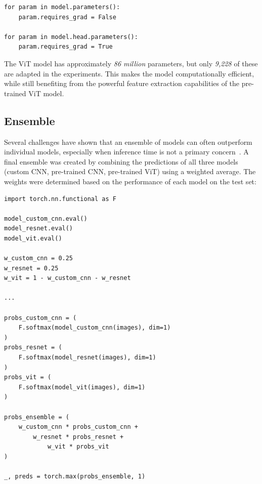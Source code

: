 \begin{minipage}{0.9\linewidth}\begin{lstlisting}[caption={Freezing the pre-trained ViT backbone and training only the classification head.},label={lst:freeze-vit-backbone}]
for param in model.parameters():
    param.requires_grad = False

for param in model.head.parameters():
    param.requires_grad = True
\end{lstlisting}\end{minipage}

The ViT model has approximately \textit{86 million} parameters, but only \textit{9,228} of these are adapted in the experiments. This makes the model computationally efficient, while still benefiting from the powerful feature extraction capabilities of the pre-trained ViT model.

\subsection{Ensemble}

Several challenges have shown that an ensemble of models can often outperform individual models, especially when inference time is not a primary concern~\cite{Stallkamp2012,DBLP:journals/corr/HeZRS15}. A final ensemble was created by combining the predictions of all three models (custom CNN, pre-trained CNN, pre-trained ViT) using a weighted average. The weights were determined based on the performance of each model on the test set:

\begin{minipage}{0.9\linewidth}\begin{lstlisting}[caption={Ensemble predictions using a weighted average.},label={lst:ensemble}]
import torch.nn.functional as F

model_custom_cnn.eval()
model_resnet.eval()
model_vit.eval()

w_custom_cnn = 0.25
w_resnet = 0.25
w_vit = 1 - w_custom_cnn - w_resnet

...

probs_custom_cnn = (
    F.softmax(model_custom_cnn(images), dim=1)
)
probs_resnet = (
    F.softmax(model_resnet(images), dim=1)
)
probs_vit = (
    F.softmax(model_vit(images), dim=1)
)

probs_ensemble = (
    w_custom_cnn * probs_custom_cnn +
        w_resnet * probs_resnet +
            w_vit * probs_vit
)

_, preds = torch.max(probs_ensemble, 1)
\end{lstlisting}\end{minipage}

